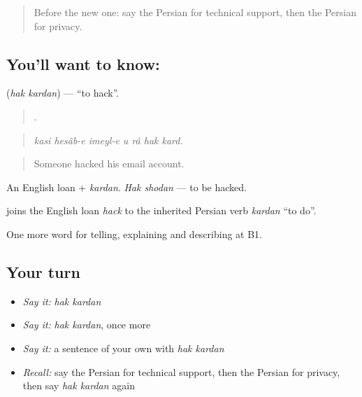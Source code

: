 \begin{quote}
Before the new one: say the Persian for technical support, then the Persian for privacy.
\end{quote}

\subsection*{You'll want to know:  }
\textbf{ } (\emph{hak kardan}) — \textquotedblleft{}to hack\textquotedblright{}.

\begin{quote}
      .
\end{quote}

\begin{quote}
\emph{kasi hesâb-e imeyl-e u râ hak kard.}
\end{quote}

\begin{quote}
Someone hacked his email account.
\end{quote}

An English loan + \emph{kardan}. \emph{Hak shodan} — to be hacked.

\begin{cousinweb}
\textbf{ } joins the English loan \emph{hack} to the inherited Persian verb \emph{kardan} \textquotedblleft{}to do\textquotedblright{}.
\end{cousinweb}

\begin{grammarlens}[title={What you've built}]
One more word for telling, explaining and describing at B1.
\end{grammarlens}

\subsection*{Your turn}
\begin{itemize}
\raggedright
  \item \emph{Say it:} \emph{hak kardan}
  \item \emph{Say it:} \emph{hak kardan}, once more
  \item \emph{Say it:} a sentence of your own with \emph{hak kardan}
  \item \emph{Recall:} say the Persian for technical support, then the Persian for privacy, then say \emph{hak kardan} again
\end{itemize}

